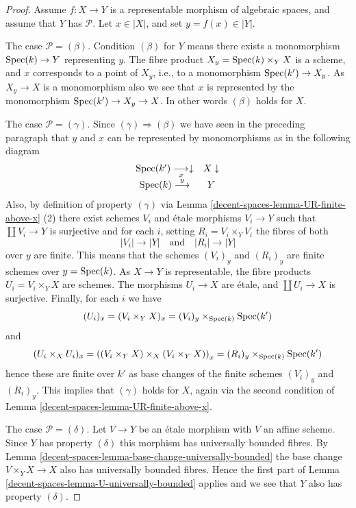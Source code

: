 \begin{proof}
Assume $f : X \to Y$ is a representable morphism of algebraic spaces,
and assume that $Y$ has $\mathcal{P}$. Let $x \in |X|$, and set
$y = f(x) \in |Y|$.

\medskip\noindent
The case $\mathcal{P} = (\beta)$. Condition $(\beta)$ for $Y$ means
there exists a monomorphism $\operatorname{Spec}(k) \to Y$ representing $y$.
The fibre product $X_y = \operatorname{Spec}(k) \times_Y X$ is a scheme, and
$x$ corresponds to a point of $X_y$, i.e., to a monomorphism
$\operatorname{Spec}(k') \to X_y$. As $X_y \to X$ is a monomorphism also we see
that $x$ is represented by the monomorphism $\operatorname{Spec}(k') \to X_y \to X$.
In other words $(\beta)$ holds for $X$.

\medskip\noindent
The case $\mathcal{P} = (\gamma)$. Since $(\gamma) \Rightarrow (\beta)$
we have seen in the preceding paragraph that $y$ and $x$ can be represented
by monomorphisms as in the following diagram
$$
\begin{array}{cc}\operatorname{Spec}(k') \underset{x}{\longrightarrow}\downarrow & X \downarrow \\ \operatorname{Spec}(k) \overset{y}{\longrightarrow} & Y\end{array}
$$
Also, by definition of property $(\gamma)$ via
Lemma \ref{decent-spaces-lemma-UR-finite-above-x} (2)
there exist schemes
$V_i$ and \'etale morphisms $V_i \to Y$ such that $\coprod V_i \to Y$
is surjective and for each $i$, setting $R_i = V_i \times_Y V_i$
the fibres of both
$$
|V_i| \longrightarrow |Y|
\quad\text{and}\quad
|R_i| \longrightarrow |Y|
$$
over $y$ are finite. This means that the schemes
$(V_i)_y$ and $(R_i)_y$ are finite schemes over $y = \operatorname{Spec}(k)$.
As $X \to Y$ is representable, the fibre products $U_i = V_i \times_Y X$
are schemes. The morphisms $U_i \to X$ are \'etale, and
$\coprod U_i \to X$ is surjective. Finally, for each $i$ we have
$$
(U_i)_x =
(V_i \times_Y X)_x =
(V_i)_y \times_{\operatorname{Spec}(k)} \operatorname{Spec}(k')
$$
and
$$
(U_i \times_X U_i)_x =
\left((V_i \times_Y X) \times_X (V_i \times_Y X)\right)_x =
(R_i)_y \times_{\operatorname{Spec}(k)} \operatorname{Spec}(k')
$$
hence these are finite over $k'$ as base changes of the finite
schemes $(V_i)_y$ and $(R_i)_y$. This implies that $(\gamma)$ holds for $X$,
again via the second condition of
Lemma \ref{decent-spaces-lemma-UR-finite-above-x}.

\medskip\noindent
The case $\mathcal{P} = (\delta)$. Let $V \to Y$ be an \'etale morphism with
$V$ an affine scheme. Since $Y$ has property $(\delta)$ this morphism has
universally bounded fibres. By
Lemma \ref{decent-spaces-lemma-base-change-universally-bounded}
the base change $V \times_Y X \to X$ also has universally bounded fibres.
Hence the first part of
Lemma \ref{decent-spaces-lemma-U-universally-bounded}
applies and we see that $Y$ also has property $(\delta)$.


\end{proof}

